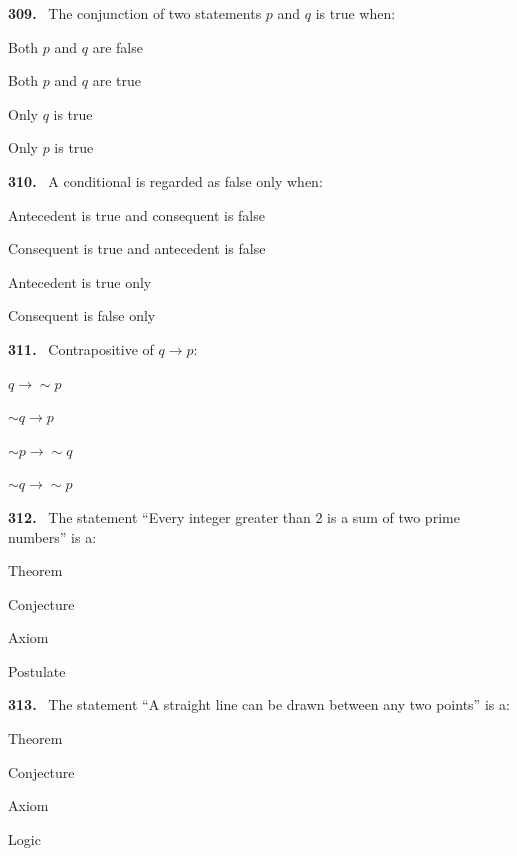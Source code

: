 \documentclass[11pt]{article}
\newenvironment{qenv}[1]{%
  \par\medskip\noindent\textbf{#1.}\ \ignorespaces
}{\par}
\begin{document}
\begin{qenv}{309} The conjunction of two statements $p$ and $q$ is true when:
\begin{options} \item Both $p$ and $q$ are false \item Both $p$ and $q$ are true \item Only $q$ is true \item Only $p$ is true \end{options} \end{qenv}

\begin{qenv}{310} A conditional is regarded as false only when:
\begin{options} \item Antecedent is true and consequent is false \item Consequent is true and antecedent is false \item Antecedent is true only \item Consequent is false only \end{options} \end{qenv}

\begin{qenv}{311} Contrapositive of $q \to p$:
\begin{options} \item $q \to \sim p$ \item $\sim q \to p$ \item $\sim p \to \sim q$ \item $\sim q \to \sim p$ \end{options} \end{qenv}

\begin{qenv}{312} The statement ``Every integer greater than 2 is a sum of two prime numbers'' is a:
\begin{options} \item Theorem \item Conjecture \item Axiom \item Postulate \end{options} \end{qenv}

\begin{qenv}{313} The statement ``A straight line can be drawn between any two points'' is a:
\begin{options} \item Theorem \item Conjecture \item Axiom \item Logic \end{options} \end{qenv}
\end{document}

